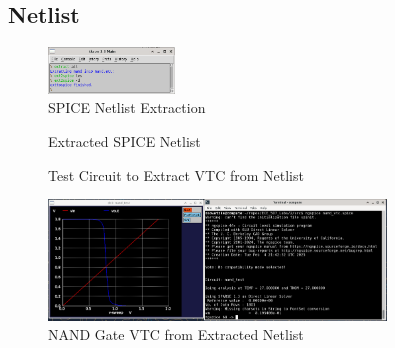 \documentclass{article}
\begin{document}
	\subsection{Netlist}
	
	\begin{figure}[H]
		\centerline{\includegraphics[width=0.3\textwidth]{nand_netlist_creation.png}}
		\caption{SPICE Netlist Extraction}
		\label{fig::nand_netlist_creation}
	\end{figure}
	
	\begin{figure}[H]
		
		\caption{Extracted SPICE Netlist}
		\label{fig::nand_netlist}
	\end{figure}
	
	\begin{figure}[H]
		
		\caption{Test Circuit to Extract VTC from Netlist}
		\label{fig::nand_vtc_extraction}
	\end{figure}
	
	\begin{figure}[H]
		\centerline{\includegraphics[width=0.8\textwidth]{nand_vtc.png}}
		\caption{NAND Gate VTC from Extracted Netlist}
		\label{fig::nand_vtc}
	\end{figure}
\end{document}
